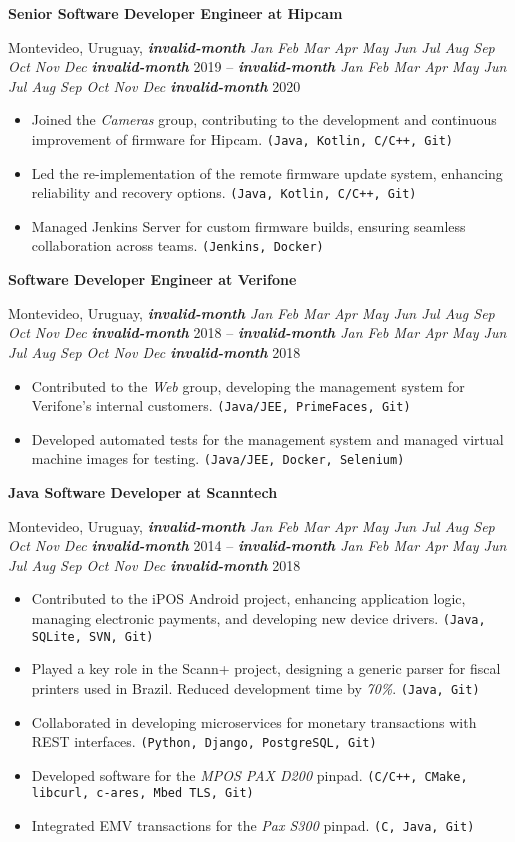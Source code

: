 \documentclass[a4paper]{article}
\newcommand{\invalidmonth}{\emph{\textbf{invalid-month}}}
\newcommand{\cvmonth}[1]{
  \ifcase#1 \invalidmonth
    \or Jan
    \or Feb
    \or Mar
    \or Apr
    \or May
    \or Jun
    \or Jul
    \or Aug
    \or Sep
    \or Oct
    \or Nov
    \or Dec
  \else
    \invalidmonth
  \fi
}
\newcommand{\cvdate}[2]{
  \emph{\cvmonth{#1}} {#2}
}
\newcommand{\cvposition}[2]{
  \noindent\textbf{#1 at #2}\par
}
\newcommand{\cvlocation}[3]{
  \noindent #1, #2 -- #3\par
}
\newenvironment{cvexperience}{
  \noindent{\large\textbf{Work Experience:}}
  \medskip
}{
  \bigskip
}
\newenvironment{cvjob}{
  \begin{sloppypar}
}{
  \end{sloppypar}
  \bigskip
}
\newcommand{\cvskills}[1]{\texttt{(#1)}}
\begin{document}
\begin{cvexperience}
\begin{cvjob}
  \cvposition{Senior Software Developer Engineer}{Hipcam}
  \cvlocation{Montevideo, Uruguay}{\cvdate{2}{2019}}{\cvdate{5}{2020}}
  \begin{itemize}
    \item Joined the \emph{Cameras} group, contributing to the development and continuous improvement of firmware 
    for Hipcam. \cvskills{Java, Kotlin, C/C++, Git}
    \item Led the re-implementation of the remote firmware update system, enhancing reliability and recovery options. 
    \cvskills{Java, Kotlin, C/C++, Git}
    \item Managed Jenkins Server for custom firmware builds, ensuring seamless collaboration across teams. 
    \cvskills{Jenkins, Docker}
  \end{itemize}
\end{cvjob}

\begin{cvjob}
  \cvposition{Software Developer Engineer}{Verifone}
  \cvlocation{Montevideo, Uruguay}{\cvdate{5}{2018}}{\cvdate{11}{2018}}
  \begin{itemize}
    \item Contributed to the \emph{Web} group, developing the management system for Verifone's internal customers. \cvskills{Java/JEE, PrimeFaces, Git}
    \item Developed automated tests for the management system and managed virtual machine images for testing. \cvskills{Java/JEE, Docker, Selenium}
  \end{itemize}
\end{cvjob}


\begin{cvjob}
  \cvposition{Java Software Developer}{Scanntech}
  \cvlocation{Montevideo, Uruguay}{\cvdate{8}{2014}}{\cvdate{4}{2018}}
  \begin{itemize}
    \item Contributed to the iPOS Android project, enhancing application logic, managing electronic payments, 
    and developing new device drivers. \cvskills{Java, SQLite, SVN, Git}
    \item Played a key role in the Scann+ project, designing a generic parser for fiscal printers used in Brazil. 
    Reduced development time by \emph{70\%}. \cvskills{Java, Git}
    \item Collaborated in developing microservices for monetary transactions with REST interfaces. 
    \cvskills{Python, Django, PostgreSQL, Git}
    \item Developed software for the \emph{MPOS PAX D200} pinpad. \cvskills{C/C++, CMake, libcurl, c-ares, Mbed TLS, Git}
    \item Integrated EMV transactions for the \emph{Pax S300} pinpad. \cvskills{C, Java, Git}
  \end{itemize}
\end{cvjob}


\end{cvexperience}
\end{document}
